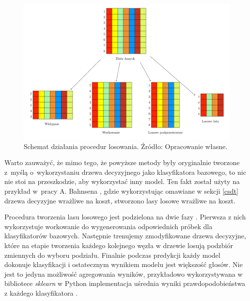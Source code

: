 \documentclass[inzynierska]{pwr_wmat_praca_dyplomowa}
\theoremstyle{plain}
\numberwithin{theorem}{chapter}
\theoremstyle{definition}
\numberwithin{theorem}{chapter}
\begin{document}
\begin{figure}[h]
	\includegraphics[width=\linewidth]{plots/sampling_plot.pdf}
	\caption{Schemat działania procedur losowania. Źródło: Opracowanie własne.}
	\label{fig:sampling_plot}
\end{figure}

Warto zauważyć, że mimo tego, że powyższe metody były oryginalnie tworzone z~myślą o~wykorzystaniu drzewa decyzyjnego jako klasyfikatora bazowego, to nic nie stoi na przeszkodzie, aby wykorzystać inny model. Ten fakt został użyty na przykład w~pracy A. Bahnsena \cite{alej2015ensemble}, gdzie wykorzystując omawiane w sekcji \ref{csdt} drzewa decyzyjne wrażliwe na koszt, stworzono lasy losowe wrażliwe na koszt.

Procedura tworzenia lasu losowego jest podzielona na dwie fazy \cite{Random_Forest}. Pierwsza z nich wykorzystuje workowanie do wygenerowania odpowiednich próbek dla klasyfikatorów bazowych. Następnie trenujemy zmodyfikowane drzewa decyzyjne, które na etapie tworzenia każdego kolejnego węzła w drzewie losują podzbiór zmiennych do wyboru podziału. Finalnie podczas predykcji każdy model dokonuje klasyfikacji i ostatecznym wynikiem modelu jest większość głosów. Nie jest to jedyna możliwość agregowania wyników, przykładowo wykorzystywana w bibliotece \textit{sklearn} w Python implementacja uśrednia wyniki prawdopodobieństwa z każdego klasyfikatora \cite{sklearn_api}.
\end{document}

